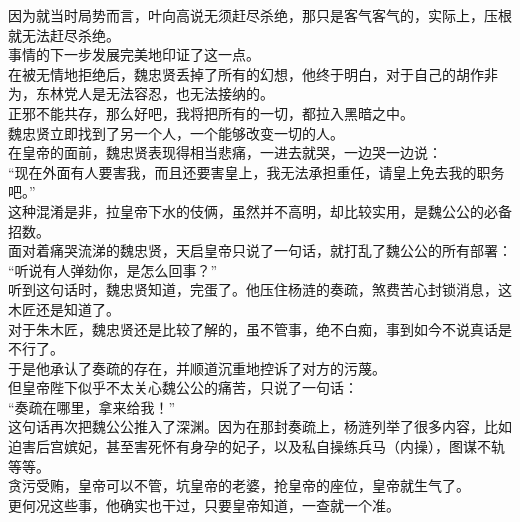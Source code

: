\begin{multicols}{\theparacolNo}
因为就当时局势而言，叶向高说无须赶尽杀绝，那只是客气客气的，实际上，压根就无法赶尽杀绝。\\

事情的下一步发展完美地印证了这一点。\\

在被无情地拒绝后，魏忠贤丢掉了所有的幻想，他终于明白，对于自己的胡作非为，东林党人是无法容忍，也无法接纳的。\\

正邪不能共存，那么好吧，我将把所有的一切，都拉入黑暗之中。\\

魏忠贤立即找到了另一个人，一个能够改变一切的人。\\

在皇帝的面前，魏忠贤表现得相当悲痛，一进去就哭，一边哭一边说：\\

“现在外面有人要害我，而且还要害皇上，我无法承担重任，请皇上免去我的职务吧。”\\

这种混淆是非，拉皇帝下水的伎俩，虽然并不高明，却比较实用，是魏公公的必备招数。\\

面对着痛哭流涕的魏忠贤，天启皇帝只说了一句话，就打乱了魏公公的所有部署：\\

“听说有人弹劾你，是怎么回事？”\\

听到这句话时，魏忠贤知道，完蛋了。他压住杨涟的奏疏，煞费苦心封锁消息，这木匠还是知道了。\\

对于朱木匠，魏忠贤还是比较了解的，虽不管事，绝不白痴，事到如今不说真话是不行了。\\

于是他承认了奏疏的存在，并顺道沉重地控诉了对方的污蔑。\\

但皇帝陛下似乎不太关心魏公公的痛苦，只说了一句话：\\

“奏疏在哪里，拿来给我！”\\

这句话再次把魏公公推入了深渊。因为在那封奏疏上，杨涟列举了很多内容，比如迫害后宫嫔妃，甚至害死怀有身孕的妃子，以及私自操练兵马（内操），图谋不轨等等。\\

贪污受贿，皇帝可以不管，坑皇帝的老婆，抢皇帝的座位，皇帝就生气了。\\

更何况这些事，他确实也干过，只要皇帝知道，一查就一个准。\\


\end{multicols}
